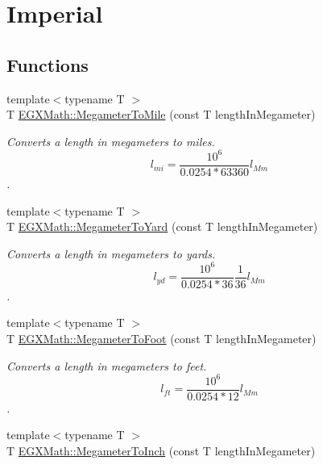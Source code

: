 \hypertarget{group___e_g_x_math-_conversions-_length_conversions-_s_i-_megameter-_imperial}{}\section{Imperial}
\label{group___e_g_x_math-_conversions-_length_conversions-_s_i-_megameter-_imperial}
\subsection*{Functions}
\begin{DoxyCompactItemize}
\item 
{\footnotesize template$<$typename T $>$ }\\T \mbox{\hyperlink{group___e_g_x_math-_conversions-_length_conversions-_s_i-_megameter-_imperial_gaa20a079fd7502961010c93e0091ab17c}{E\+G\+X\+Math\+::\+Megameter\+To\+Mile}} (const T length\+In\+Megameter)
\begin{DoxyCompactList}\small\item\em Converts a length in megameters to miles. \[ l_{mi}=\frac{10^{6}}{0.0254 * 63360} l_{Mm} \]. \end{DoxyCompactList}\item 
{\footnotesize template$<$typename T $>$ }\\T \mbox{\hyperlink{group___e_g_x_math-_conversions-_length_conversions-_s_i-_megameter-_imperial_gae8b77cb5d4f8cf566968e18dde870c74}{E\+G\+X\+Math\+::\+Megameter\+To\+Yard}} (const T length\+In\+Megameter)
\begin{DoxyCompactList}\small\item\em Converts a length in megameters to yards. \[ l_{yd}= \frac{10^{6}}{0.0254 * 36} \frac{1}{36} l_{Mm} \]. \end{DoxyCompactList}\item 
{\footnotesize template$<$typename T $>$ }\\T \mbox{\hyperlink{group___e_g_x_math-_conversions-_length_conversions-_s_i-_megameter-_imperial_ga5586abd81d8635465b9be7f9be5fadc7}{E\+G\+X\+Math\+::\+Megameter\+To\+Foot}} (const T length\+In\+Megameter)
\begin{DoxyCompactList}\small\item\em Converts a length in megameters to feet. \[ l_{ft}= \frac{10^{6}}{0.0254 * 12} l_{Mm} \]. \end{DoxyCompactList}\item 
{\footnotesize template$<$typename T $>$ }\\T \mbox{\hyperlink{group___e_g_x_math-_conversions-_length_conversions-_s_i-_megameter-_imperial_ga21eaef4c8ebcc2982ac3a212dc462a95}{E\+G\+X\+Math\+::\+Megameter\+To\+Inch}} (const T length\+In\+Megameter)

\end{DoxyCompactItemize}
